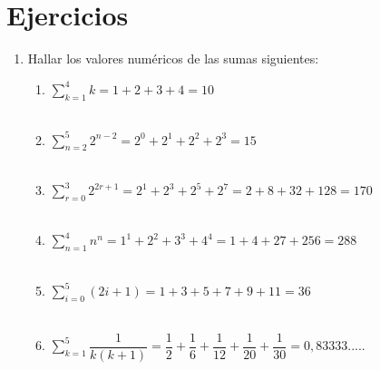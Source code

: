 \section{Ejercicios}
\begin{enumerate}
\item Hallar los valores numéricos de las sumas siguientes:
\begin{enumerate}[\bfseries a)]
\item $\displaystyle\sum_{k=1}^{4} k = 1 + 2 + 3 + 4 = 10$\\\\
\item $\displaystyle\sum_{n=2}^{5} 2^{n-2} = 2^{0} + 2^{1} + 2^{2} + 2^{3} = 15$\\\\
\item $\displaystyle\sum_{r=0}^{3} 2^{2r+1} = 2^{1} + 2^{3} +  2^{5} + 2^{7} = 2 + 8 + 32 + 128 = 170$ \\\\
\item $\displaystyle\sum_{n=1}^{4} n^n = 1^1 + 2^2 + 3^3 + 4^4 = 1 + 4 + 27 + 256= 288$ \\\\
\item $\displaystyle\sum_{i=0}^{5} (2i + 1) = 1 + 3 + 5 + 7 + 9 + 11 = 36$ \\\\
\item $\displaystyle\sum_{k=1}^{5} \dfrac{1}{k(k+1)} = \dfrac{1}{2} + \dfrac{1}{6} + \dfrac{1}{12} + \dfrac{1}{20} + \dfrac{1}{30} = 0,83333.....$ \\\\
\end{enumerate}


\end{enumerate}
